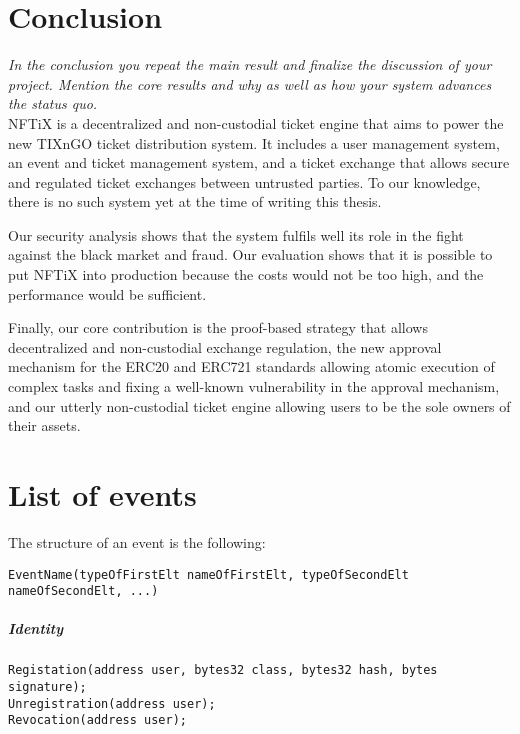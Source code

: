 \documentclass[a4paper,11pt,oneside]{report}
\begin{document}
\chapter{Conclusion}

\textit{In the conclusion you repeat the main result and finalize the discussion of
your project. Mention the core results and why as well as how your system
advances the status quo.} \\

NFTiX is a decentralized and non-custodial ticket engine that aims to power the new TIXnGO ticket distribution system. It includes a user management system, an event and ticket management system, and a ticket exchange that allows secure and regulated ticket exchanges between untrusted parties. To our knowledge, there is no such system yet at the time of writing this thesis.

Our security analysis shows that the system fulfils well its role in the fight against the black market and fraud. Our evaluation shows that it is possible to put NFTiX into production because the costs would not be too high, and the performance would be sufficient.

Finally, our core contribution is the proof-based strategy that allows decentralized and non-custodial exchange regulation, the new approval mechanism for the ERC20 and ERC721 standards allowing atomic execution of complex tasks and fixing a well-known vulnerability in the approval mechanism, and our utterly non-custodial ticket engine allowing users to be the sole owners of their assets.

\cleardoublepage
{}
{}
\nocite{*}
\printbibliography

\appendix
\chapter{List of events}
\label{sec:appendix_a}

The structure of an event is the following: 
\begin{verbatim}
EventName(typeOfFirstElt nameOfFirstElt, typeOfSecondElt nameOfSecondElt, ...)
\end{verbatim}

\paragraph{Identity}
\begin{verbatim}
Registation(address user, bytes32 class, bytes32 hash, bytes signature);
Unregistration(address user);
Revocation(address user);
\end{verbatim}
\end{document}
